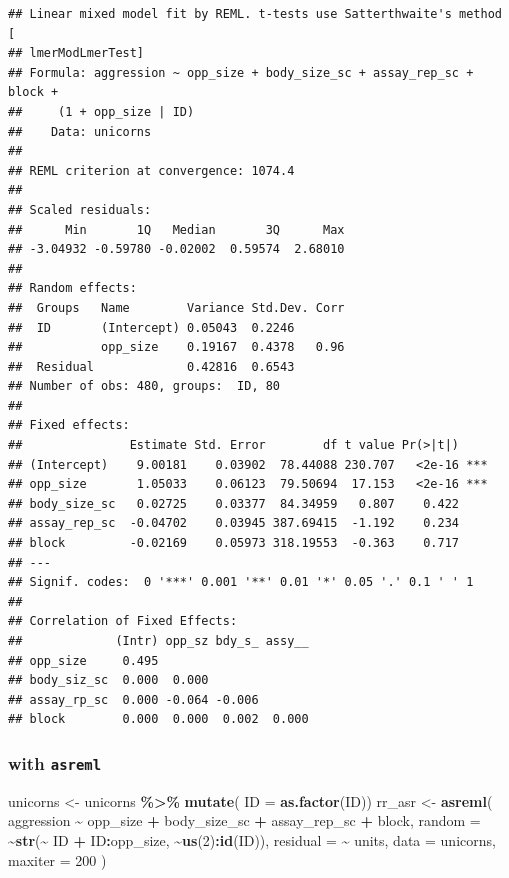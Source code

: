 \documentclass[
  12pt,
]{book}
\newenvironment{Shaded}{\begin{snugshade}}{\end{snugshade}}
\newcommand{\DataTypeTok}[1]{\textcolor[rgb]{0.13,0.29,0.53}{#1}}
\newcommand{\DecValTok}[1]{\textcolor[rgb]{0.00,0.00,0.81}{#1}}
\newcommand{\KeywordTok}[1]{\textcolor[rgb]{0.13,0.29,0.53}{\textbf{#1}}}
\newcommand{\NormalTok}[1]{#1}
\newcommand{\OperatorTok}[1]{\textcolor[rgb]{0.81,0.36,0.00}{\textbf{#1}}}
\newcommand{\StringTok}[1]{\textcolor[rgb]{0.31,0.60,0.02}{#1}}
\begin{document}
\begin{verbatim}
## Linear mixed model fit by REML. t-tests use Satterthwaite's method [
## lmerModLmerTest]
## Formula: aggression ~ opp_size + body_size_sc + assay_rep_sc + block +  
##     (1 + opp_size | ID)
##    Data: unicorns
## 
## REML criterion at convergence: 1074.4
## 
## Scaled residuals: 
##      Min       1Q   Median       3Q      Max 
## -3.04932 -0.59780 -0.02002  0.59574  2.68010 
## 
## Random effects:
##  Groups   Name        Variance Std.Dev. Corr
##  ID       (Intercept) 0.05043  0.2246       
##           opp_size    0.19167  0.4378   0.96
##  Residual             0.42816  0.6543       
## Number of obs: 480, groups:  ID, 80
## 
## Fixed effects:
##               Estimate Std. Error        df t value Pr(>|t|)    
## (Intercept)    9.00181    0.03902  78.44088 230.707   <2e-16 ***
## opp_size       1.05033    0.06123  79.50694  17.153   <2e-16 ***
## body_size_sc   0.02725    0.03377  84.34959   0.807    0.422    
## assay_rep_sc  -0.04702    0.03945 387.69415  -1.192    0.234    
## block         -0.02169    0.05973 318.19553  -0.363    0.717    
## ---
## Signif. codes:  0 '***' 0.001 '**' 0.01 '*' 0.05 '.' 0.1 ' ' 1
## 
## Correlation of Fixed Effects:
##             (Intr) opp_sz bdy_s_ assy__
## opp_size     0.495                     
## body_siz_sc  0.000  0.000              
## assay_rp_sc  0.000 -0.064 -0.006       
## block        0.000  0.000  0.002  0.000
\end{verbatim}

\hypertarget{with-asreml}{%
\subsubsection{\texorpdfstring{with \texttt{asreml}}{with asreml}}\label{with-asreml}}

\begin{Shaded}
\begin{Highlighting}[]
\NormalTok{unicorns \textless{}{-}}\StringTok{ }\NormalTok{unicorns }\OperatorTok{\%\textgreater{}\%}
\StringTok{  }\KeywordTok{mutate}\NormalTok{( }\DataTypeTok{ID =} \KeywordTok{as.factor}\NormalTok{(ID))}
\NormalTok{rr\_asr \textless{}{-}}\StringTok{ }\KeywordTok{asreml}\NormalTok{(}
\NormalTok{  aggression }\OperatorTok{\textasciitilde{}}\StringTok{ }\NormalTok{opp\_size }\OperatorTok{+}\StringTok{ }\NormalTok{body\_size\_sc }\OperatorTok{+}\StringTok{ }\NormalTok{assay\_rep\_sc }\OperatorTok{+}\StringTok{ }\NormalTok{block,}
  \DataTypeTok{random =} \OperatorTok{\textasciitilde{}}\KeywordTok{str}\NormalTok{(}\OperatorTok{\textasciitilde{}}\StringTok{ }\NormalTok{ID }\OperatorTok{+}\StringTok{ }\NormalTok{ID}\OperatorTok{:}\NormalTok{opp\_size, }\OperatorTok{\textasciitilde{}}\KeywordTok{us}\NormalTok{(}\DecValTok{2}\NormalTok{)}\OperatorTok{:}\KeywordTok{id}\NormalTok{(ID)),}
  \DataTypeTok{residual =} \OperatorTok{\textasciitilde{}}\StringTok{ }\NormalTok{units,}
  \DataTypeTok{data =}\NormalTok{ unicorns,}
  \DataTypeTok{maxiter =} \DecValTok{200}
\NormalTok{)}
\end{Highlighting}
\end{Shaded}
\end{document}
